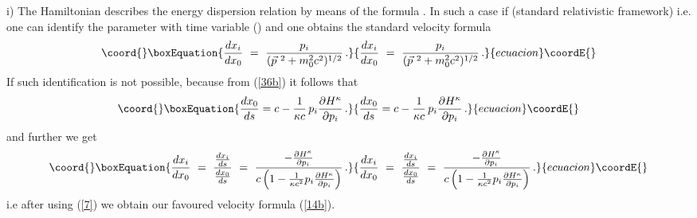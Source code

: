 \documentclass[a4paper,12pt]{article}
\begin{document}
i) The Hamiltonian \coordHE{} describes the energy
dispersion relation \coordHE{} by means of the
formula \coordHE{}. In such a case if \myHighlight{$\kappa \to
\infty$}\coordHE{} (standard relativistic framework) i.e. \coordHE{} one can
identify the parameter \coordHE{} with time variable (\coordHE{}) and one obtains the
standard velocity formula
\begin{equation}\coord{}\boxEquation{\label{37}
\frac{dx_i}{dx_0} \ = \ \frac{p_i}{(\vec{p}^{\ 2} + m^2_0
c^2)^{1/2}} \, .
}{\frac{dx_i}{dx_0} \ = \ \frac{p_i}{(\vec{p}^{\ 2} + m^2_0
c^2)^{1/2}} \, .
}{ecuacion}\coordE{}\end{equation}
If \coordHE{} such identification is not possible, because
from (\ref{36b}) it follows that
\begin{equation}\coord{}\boxEquation{\label{38}
\frac{dx_0}{ds}= c - \frac{1}{\kappa c} \, p_i \frac{\partial
H^\kappa}{\partial p_i}\, .
}{\frac{dx_0}{ds}= c - \frac{1}{\kappa c} \, p_i \frac{\partial
H^\kappa}{\partial p_i}\, .
}{ecuacion}\coordE{}\end{equation}
and further we get
\begin{equation}\coord{}\boxEquation{\label{39}
\frac{dx_i}{dx_0} \ = \ \frac{\frac{dx_i}{ds}}{\frac{dx_0}{ds}} \
= \ \frac{- \frac{\partial H^{\kappa}}{\partial p_i}}{c\left(1 -
\frac{1}{\kappa c^2} p _i \frac{\partial H^{\kappa}}{\partial
p_i}\right) }\, .
}{\frac{dx_i}{dx_0} \ = \ \frac{\frac{dx_i}{ds}}{\frac{dx_0}{ds}} \
= \ \frac{- \frac{\partial H^{\kappa}}{\partial p_i}}{c\left(1 -
\frac{1}{\kappa c^2} p _i \frac{\partial H^{\kappa}}{\partial
p_i}\right) }\, .
}{ecuacion}\coordE{}\end{equation}
i.e after using  (\ref{7}) we obtain our favoured velocity formula
(\ref{14b}).
\end{document}
